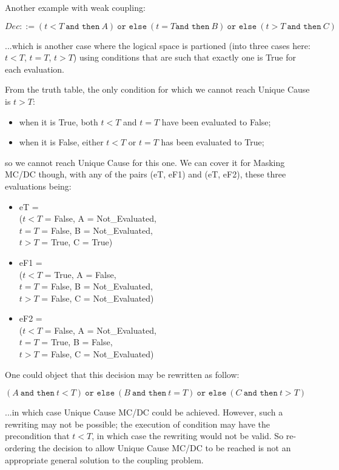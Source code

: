 \documentclass[a4paper,12pt,twoside]{article}
\newcommand{\andthen}{\texttt{and then}}
\newcommand{\orelse}{\texttt{or else}}
\begin{document}
Another example with weak coupling:

$Dec ::= (t < T \ \andthen{} \ A)
  \ \orelse{} \ (t = T \andthen{} \ B)
  \ \orelse{} \ (t > T \ \andthen{} \ C)$

...which is another case where the logical space is partioned (into three
cases here: $t < T$, $t = T$, $t > T$) using conditions that are such
that exactly one is True for each evaluation.

From the truth table, the only condition for which we cannot reach
Unique Cause is $t > T$:
\begin{itemize}
\item when it is True, both $t < T$ and $t = T$ have been evaluated to False;
\item when it is False, either $t < T$ or $t = T$ has been evaluated to True;
\end{itemize}
so we cannot reach Unique Cause for this one. We can cover it for
Masking MC/DC though, with any of the pairs (eT, eF1) and
(eT, eF2), these three evaluations being:
\begin{itemize}
\item eT = \\
($t < T$ = False, A = Not\_Evaluated,\\
 $t = T$ = False, B = Not\_Evaluated,\\
 $t > T$ = True,  C = True)

\item eF1 = \\
($t < T$ = True,  A = False,\\
 $t = T$ = False, B = Not\_Evaluated,\\
 $t > T$ = False, C = Not\_Evaluated)

\item eF2 = \\
($t < T$ = False, A = Not\_Evaluated,\\
 $t = T$ = True,  B = False,\\
 $t > T$ = False, C = Not\_Evaluated)
\end{itemize}

One could object that this decision may be rewritten as follow:

$(A \ \andthen{} \ t < T)
  \ \orelse{} \ (B \ \andthen{} \ t = T)
  \ \orelse{} \ (C \ \andthen{} \ t > T)$

...in which case Unique Cause MC/DC could be achieved. However, such a
rewriting may not be possible; the execution of condition may have the
precondition that $t < T$, in which case the rewriting would not be
valid. So re-ordering the decision to allow Unique Cause MC/DC to be
reached is not an appropriate general solution to the coupling
problem.
\end{document}
